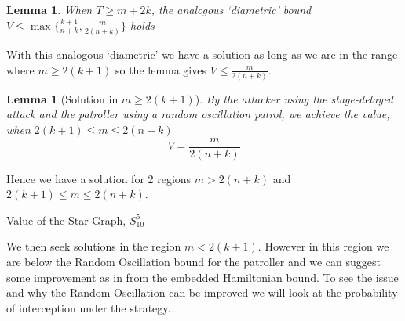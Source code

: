 \documentclass[a4paper,10pt]{article}
\newtheorem{lemma}[theorem]{Lemma}
\theoremstyle{definition}
\theoremstyle{definition}
\theoremstyle{remark}
\theoremstyle{definition}
\begin{document}
\begin{myfigure}
\begin{center}
\end{center}
\end{myfigure}

\begin{lemma}
When $T \geq m+2k$, the analogous `diametric' bound $V \leq \max \{ \frac{k+1}{n+k} , \frac{m}{2(n+k)}   \}$ holds
\end{lemma}

With this analogous `diametric' we have a solution as long as we are in the range where $m \geq 2(k+1)$ so the lemma gives $V \leq \frac{m}{2(n+k)}$.

\begin{lemma}[Solution in $m \geq 2(k+1)$]
By the attacker using the stage-delayed attack and the patroller using a random oscillation patrol, we achieve the value, when $2(k+1) \leq m \leq 2(n+k)$
$$V=\frac{m}{2(n+k)}$$
\end{lemma}

Hence we have a solution for 2 regions $m > 2(n+k)$ and $2(k+1) \leq m \leq 2(n+k)$.

\begin{myfigure}
\resizebox{0.95\linewidth}{!}{
}
\caption{Value of the Star Graph, $S_{10}^{5}$}
\end{myfigure}

We then seek solutions in the region $m < 2(k+1)$. However in this region we are below the Random Oscillation bound for the patroller and we can suggest some improvement as in \cite{Papadaki2016} from the embedded Hamiltonian bound. To see the issue and why the Random Oscillation can be improved we will look at the probability of interception under the strategy.
\end{document}
